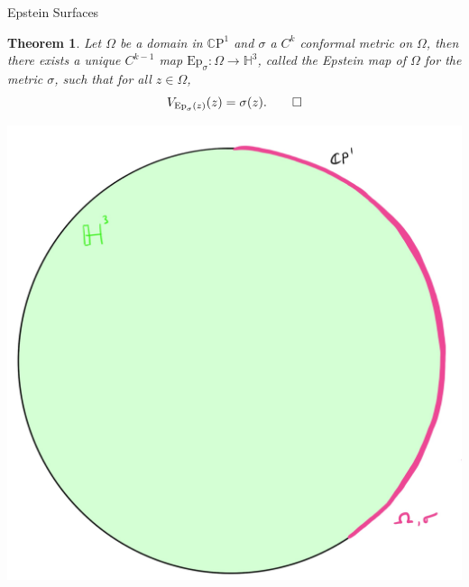 \documentclass[professionalfont]{beamer}
\newcommand{\CP}{\mathbb{C}\mathrm{P}}
\renewcommand{\H}{\mathbb{H}}
\newtheorem{thm}{Theorem}[section]
\begin{document}


\begin{frame}{Epstein Surfaces}


\begin{thm}
Let $\Omega$ be a domain in $\CP^1$  and $\sigma$ a $C^k$ conformal metric on $\Omega$, then there exists a unique $C^{k-1}$ map $\mathrm{Ep}_\sigma : \Omega \to \H^3$, called the Epstein map of $\Omega$ for the metric $\sigma$, such that for all $z \in \Omega$,
\[
V_{\mathrm{Ep}_\sigma(z)}(z) = \sigma(z). \qed
\]
\end{thm}


\centering\includegraphics[scale=0.06]{Epstein-1.jpg}

\end{frame}
\end{document}
